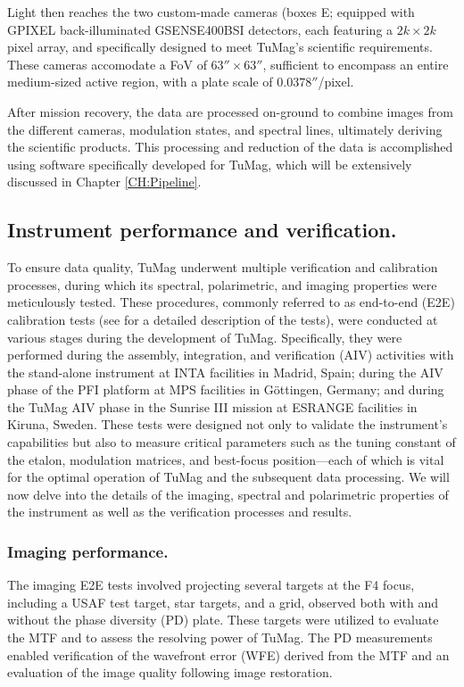 Light then reaches the two custom-made cameras (boxes E; \citealt{tumag-cams} equipped with GPIXEL back-illuminated GSENSE400BSI detectors, each featuring a $2k \times 2k$ pixel array, and specifically designed to meet TuMag's scientific requirements. These cameras accomodate a FoV of $63'' \times 63''$, sufficient to encompass an entire medium-sized active region, with a plate scale of $0.0378''$/pixel.

After mission recovery, the data are processed on-ground to combine images from the different cameras, modulation states, and spectral lines, ultimately deriving the scientific products. This processing and reduction of the data is accomplished using software specifically developed for TuMag, which will be extensively discussed in Chapter \ref{CH:Pipeline}. 

\subsection{Instrument performance and verification.}

To ensure data quality, TuMag underwent multiple verification and calibration processes, during which its spectral, polarimetric, and imaging properties were meticulously tested. These procedures, commonly referred to as end-to-end (E2E) calibration tests (see \cite{e2e-tests-inta} for a detailed description of the tests), were conducted at various stages during the development of TuMag. Specifically, they were performed during the assembly, integration, and verification (AIV) activities with the stand-alone instrument at INTA facilities in Madrid, Spain; during the AIV phase of the PFI platform at MPS facilities in Göttingen, Germany; and during the TuMag AIV phase in the Sunrise III mission at ESRANGE facilities in Kiruna, Sweden. These tests were designed not only to validate the instrument's capabilities but also to measure critical parameters such as the tuning constant of the etalon, modulation matrices, and best-focus position—each of which is vital for the optimal operation of TuMag and the subsequent data processing. We will now delve into the details of the imaging, spectral and polarimetric properties of the instrument as well as the verification processes and results.

\subsubsection{Imaging performance.}

The imaging E2E tests involved projecting several targets at the F4 focus, including a USAF test target, star targets, and a grid, observed both with and without the phase diversity (PD) plate. These targets were utilized to evaluate the MTF and to assess the resolving power of TuMag. The PD measurements enabled verification of the wavefront error (WFE) derived from the MTF and an evaluation of the image quality following image restoration. 

